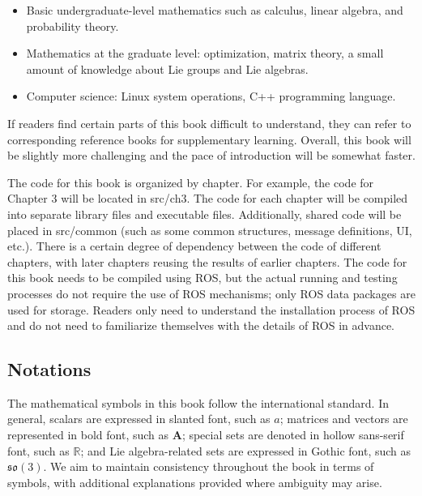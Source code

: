 \begin{itemize}
	\item Basic undergraduate-level mathematics such as calculus, linear algebra, and probability theory.
	\item Mathematics at the graduate level: optimization, matrix theory, a small amount of knowledge about Lie groups and Lie algebras.
	\item Computer science: Linux system operations, C++ programming language.
\end{itemize}

If readers find certain parts of this book difficult to understand, they can refer to corresponding reference books for supplementary learning. Overall, this book will be slightly more challenging and the pace of introduction will be somewhat faster.

The code for this book is organized by chapter. For example, the code for Chapter 3 will be located in src/ch3. The code for each chapter will be compiled into separate library files and executable files. Additionally, shared code will be placed in src/common (such as some common structures, message definitions, UI, etc.). There is a certain degree of dependency between the code of different chapters, with later chapters reusing the results of earlier chapters. The code for this book needs to be compiled using ROS, but the actual running and testing processes do not require the use of ROS mechanisms; only ROS data packages are used for storage. Readers only need to understand the installation process of ROS and do not need to familiarize themselves with the details of ROS in advance.

\subsection*{Notations}
The mathematical symbols in this book follow the international standard. In general, scalars are expressed in slanted font, such as $a$; matrices and vectors are represented in bold font, such as $\mathbf{A}$; special sets are denoted in hollow sans-serif font, such as $\mathbb{R}$; and Lie algebra-related sets are expressed in Gothic font, such as $\mathfrak{so}(3)$. We aim to maintain consistency throughout the book in terms of symbols, with additional explanations provided where ambiguity may arise.

